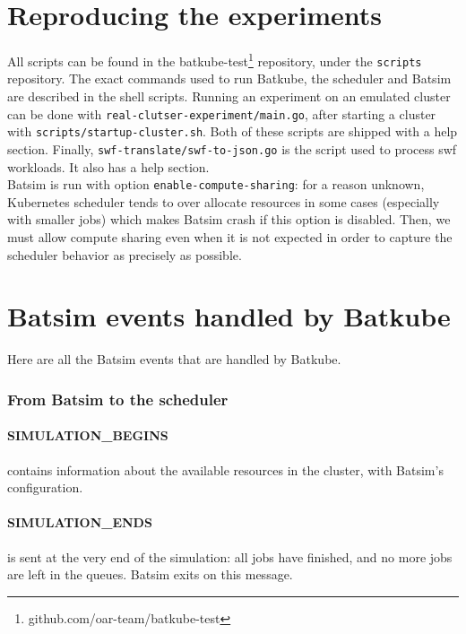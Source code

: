 \section{Reproducing the experiments} \label{sec:reproduce-expes}

All scripts can be found in the
batkube-test\footnote{github.com/oar-team/batkube-test} repository, under the
\texttt{scripts} repository. The exact commands used to run Batkube, the
scheduler and Batsim are described in the shell scripts. Running an experiment
on an emulated cluster can be done with
\texttt{real-clutser-experiment/main.go}, after starting a cluster with
\texttt{scripts/startup-cluster.sh}. Both of these scripts are shipped with a
help section. Finally, \texttt{swf-translate/swf-to-json.go} is the script used
to process swf workloads. It also has a help section.\\

Batsim is run with option \texttt{enable-compute-sharing}: for a reason
unknown, Kubernetes scheduler tends to over allocate resources in some cases
(especially with smaller jobs) which makes Batsim crash if this option is
disabled. Then, we must allow compute sharing even when it is not expected in
order to capture the scheduler behavior as precisely as possible.\\

\section{Batsim events handled by Batkube} \label{sec:batmsg-list}

Here are all the Batsim events that are handled by Batkube.

\subsubsection{From Batsim to the scheduler}

\paragraph{SIMULATION\_BEGINS}
contains information about the available resources in the cluster, with
Batsim's configuration.

\paragraph{SIMULATION\_ENDS}
is sent at the very end of the simulation: all jobs have finished, and no more
jobs are left in the queues. Batsim exits on this message.

